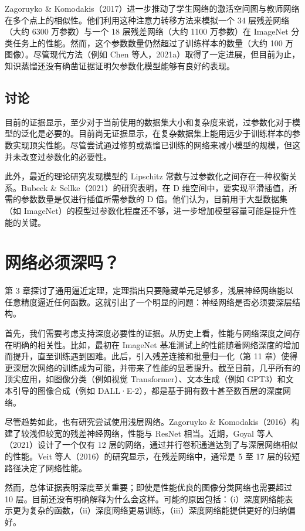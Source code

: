 \documentclass[lang=cn,newtx,10pt,scheme=chinese]{elegantbook}
\begin{document}
Zagoruyko \& Komodakis（2017）进一步推动了学生网络的激活空间图与教师网络在多个点上的相似性。他们利用这种注意力转移方法来模拟一个 34 层残差网络（大约 6300 万参数）与一个 18 层残差网络（大约 1100 万参数）在 ImageNet 分类任务上的性能。然而，这个参数数量仍然超过了训练样本的数量（大约 100 万图像）。尽管现代方法（例如 Chen 等人，2021a）取得了一定进展，但目前为止，知识蒸馏还没有确凿证据证明欠参数化模型能够有良好的表现。

\subsection{讨论}
目前的证据显示，至少对于当前使用的数据集大小和复杂度来说，过参数化对于模型的泛化是必要的。目前尚无证据显示，在复杂数据集上能用远少于训练样本的参数实现顶尖性能。尽管尝试通过修剪或蒸馏已训练的网络来减小模型的规模，但这并未改变过参数化的必要性。

此外，最近的理论研究发现模型的 Lipschitz 常数与过参数化之间存在一种权衡关系。Bubeck \& Sellke（2021）的研究表明，在 D 维空间中，要实现平滑插值，所需的参数数量是仅进行插值所需参数的 D 倍。他们认为，目前用于大型数据集（如 ImageNet）的模型过参数化程度还不够，进一步增加模型容量可能是提升性能的关键。


\section{网络必须深吗？}
第 3 章探讨了通用逼近定理，定理指出只要隐藏单元足够多，浅层神经网络能以任意精度逼近任何函数。这就引出了一个明显的问题：神经网络是否必须要深层结构。

首先，我们需要考虑支持深度必要性的证据。从历史上看，性能与网络深度之间存在明确的相关性。比如，最初在 ImageNet 基准测试上的性能随着网络深度的增加而提升，直至训练遇到困难。此后，引入残差连接和批量归一化（第 11 章）使得更深层次网络的训练成为可能，并带来了性能的显著提升。截至目前，几乎所有的顶尖应用，如图像分类（例如视觉 Transformer）、文本生成（例如 GPT3）和文本引导的图像合成（例如 DALL·E-2），都是基于拥有数十甚至数百层的深度网络。

尽管趋势如此，也有研究尝试使用浅层网络。Zagoruyko \& Komodakis（2016）构建了较浅但较宽的残差神经网络，性能与 ResNet 相当。近期，Goyal 等人（2021）设计了一个仅有 12 层的网络，通过并行卷积通道达到了与深层网络相似的性能。Veit 等人（2016）的研究显示，在残差网络中，通常是 5 至 17 层的较短路径决定了网络性能。

然而，总体证据表明深度至关重要；即使是性能优良的图像分类网络也需要超过 10 层。目前还没有明确解释为什么会这样。可能的原因包括：（i）深度网络能表示更为复杂的函数，（ii）深度网络更易训练，（iii）深度网络能提供更好的归纳偏好。
\end{document}
